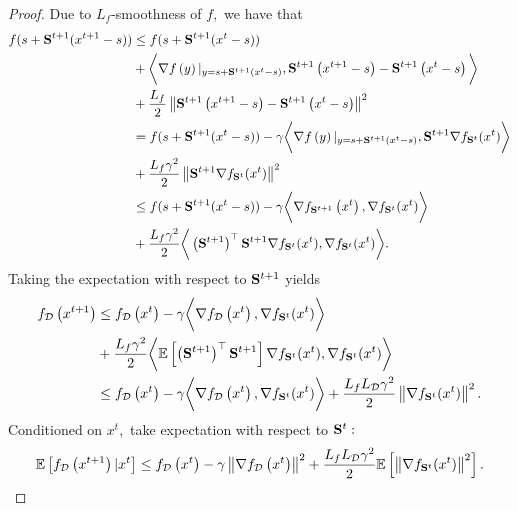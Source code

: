 \documentclass{article}
\newcommand{\bb}{\mathbb}
\newcommand{\Exp}[1]{{\bb E}\left[#1\right]}
\theoremstyle{plain}
\newcommand{\tf}{f_{\mathcal{D}}}
\newcommand{\mS}{{\bf S}}
\theoremstyle{plain}
\theoremstyle{definition}
\theoremstyle{remark}
\begin{document}
\begin{proof}
	Due to $L_f$-smoothness of $f,$ we have that
	\begin{equation*}
		\begin{split}
			f(s+\mS^{t+1}(x^{t+1} - s)) &\leq f(s+\mS^{t+1}(x^{t} - s))\\
			& + \bigg{<} \nabla f\left(y\right)|_{y=s+\mS^{t+1}(x^t-s)}, \mS^{t+1}\left(x^{t+1} - s\right) - \mS^{t+1}\left(x^t-s\right) \bigg{>}\\
			& + \frac{L_f}{2}\left\|\mS^{t+1}\left(x^{t+1} - s\right) - \mS^{t+1}\left(x^t-s\right) \right\|^2\\
			& = f(s+\mS^{t+1}(x^{t} - s)) -\gamma \bigg{<} \nabla f\left(y\right)|_{y=s+\mS^{t+1}(x^t-s)}, \mS^{t+1}\nabla f_{\mS^{t}}(x^t) \bigg{>}\\
			& + \frac{L_f\gamma^2}{2}\left\|\mS^{t+1}\nabla f_{\mS^{t}}(x^t) \right\|^2\\
			& \leq f(s+\mS^{t+1}(x^{t} - s))-\gamma \bigg{<} \nabla f_{\mS^{t+1}}\left(x^t\right), \nabla f_{\mS^{t}}(x^t) \bigg{>}\\
			& + \frac{L_f\gamma^2}{2}\bigg{<} \left(\mS^{t+1}\right)^{\top}\mS^{t+1}\nabla f_{\mS^{t}}(x^t), \nabla f_{\mS^{t}}(x^t) \bigg{>}.\\
		\end{split}
	\end{equation*}
	Taking the expectation with respect to $\mS^{t+1}$ yields
	\begin{equation*}
		\begin{split}
			\tf\left(x^{t+1}\right) &\leq \tf\left(x^{t}\right) - \gamma\bigg{<} \nabla \tf\left(x^t\right), \nabla f_{\mS^{t}}(x^t) \bigg{>}\\
            & + \frac{L_f\gamma^2}{2}\bigg{<} \Exp{\left(\mS^{t+1}\right)^{\top}\mS^{t+1}}\nabla f_{\mS^{t}}(x^t), \nabla f_{\mS^{t}}(x^t) \bigg{>}\\
			&\leq \tf\left(x^{t}\right) - \gamma\bigg{<} \nabla \tf\left(x^t\right), \nabla f_{\mS^{t}}(x^t) \bigg{>} + \frac{L_fL_{\mathcal{D}}\gamma^2}{2}\left\|\nabla f_{\mS^{t}}(x^t)\right\|^2.
		\end{split}
	\end{equation*}
	Conditioned on $x^t,$ take expectation with respect to $\mS^{t}:$
	\begin{equation*}
		\begin{split}
			\Exp{\tf\left(x^{t+1}\right)|x^t} \leq \tf\left(x^{t}\right) - \gamma \left\|\nabla \tf\left(x^t\right)\right\|^2 + \frac{L_fL_{\mathcal{D}}\gamma^2}{2}\Exp{\left\|\nabla f_{\mS^{t}}(x^t) \right\|^2}.\\

\end{split}
\end{equation*}
\end{proof}
\end{document}
